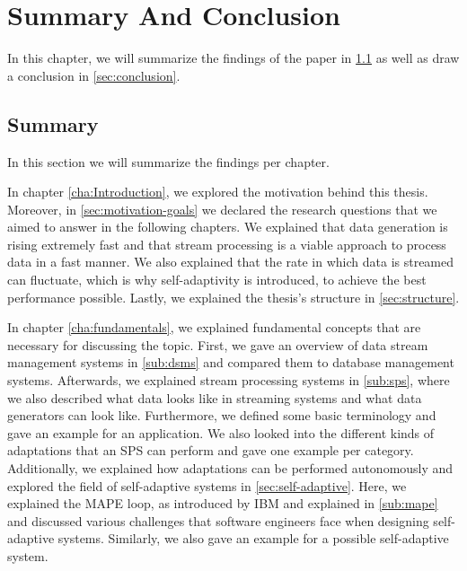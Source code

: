 \chapter{Summary And Conclusion}
In this chapter, we will summarize the findings of the paper in \ref{sec:summary} as well as draw a conclusion in \ref{sec:conclusion}.
\label{cha:summary}
\section{Summary}
\label{sec:summary}
In this section we will summarize the findings per chapter.

\quad In chapter \ref{cha:Introduction}, we explored the motivation behind this thesis. 
Moreover, in \ref{sec:motivation-goals} we declared the research questions that we aimed to answer in the following chapters.
We explained that data generation is rising extremely fast and that stream processing is a viable approach to process data in a fast manner. 
We also explained that the rate in which data is streamed can fluctuate, which is why self-adaptivity is introduced, to achieve the best performance possible.
Lastly, we explained the thesis's structure in \ref{sec:structure}.

\quad In chapter \ref{cha:fundamentals}, we explained fundamental concepts that are necessary for discussing the topic. 
First, we gave an overview of data stream management systems in \ref{sub:dsms} and compared them to database management systems. 
Afterwards, we explained stream processing systems in \ref{sub:sps}, where we also described what data looks like in streaming systems and what data generators can look like. 
Furthermore, we defined some basic terminology and gave an example for an application.
We also looked into the different kinds of adaptations that an SPS can perform and gave one example per category. 
Additionally, we explained how adaptations can be performed autonomously and explored the field of self-adaptive systems in \ref{sec:self-adaptive}.
Here, we explained the MAPE loop, as introduced by IBM and explained in \ref{sub:mape} and discussed various 
challenges that software engineers face when designing self-adaptive systems.
Similarly, we also gave an example for a possible self-adaptive system.

